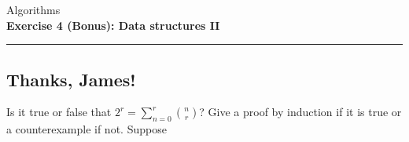 \documentclass[10pt,a4paper,fleqn]{exam}
\begin{document}
\begin{center}
\Large Algorithms \\
\LARGE \textbf{Exercise 4 (Bonus): Data structures II} \\
\end{center}

\hrule

\vspace{0.5cm}

\marksnotpoints
\pointsdroppedatright
\marksnotpoints
\marginpointname{ \points}





\begin{questions}

\section{Thanks, James!}

\question Is it true or false that $\displaystyle 2^r = \sum_{n=0}^{r} \binom{n}{r}$? Give a proof by induction if it is true or a counterexample if not.
\question Suppose 

\end{questions}
\end{document}
